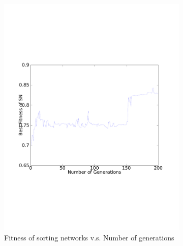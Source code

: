 \documentclass[11pt]{article}
\begin{document}
\begin{figure}[h!]
\centering
\begin{subfigure}[b]{0.49\textwidth}
	\includegraphics[width=\textwidth]{4_1.pdf}
	\caption{Fitness of sorting networks v.s. Number of generations}
\end{subfigure}
\begin{subfigure}[b]{0.49\textwidth}

\end{subfigure}
\end{figure}
\end{document}
